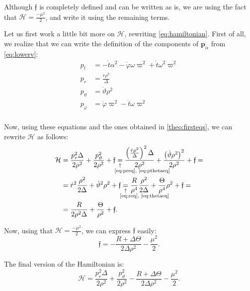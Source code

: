Although $\mathfrak{f}$ is completely defined and can be written as is, we are using the fact that $\mathcal{H} = \frac{-\mu^2}{2}$, and write it using the remaining terms.

Let us first work a little bit more on $\mathcal{H}$, rewriting \autoref{eq:hamiltonian}. First of all, we realize that we can write the definition of the components of $\mathbf{p}_\alpha$ from \autoref{eq:lowerv}:
\begin{align}
	\label{eq:pteq}
	p_t &= -\dot{t}\alpha^2 - \dot{\varphi}\omega\varpi^2 + \dot{t}\omega^2\varpi^2 \\
	\label{eq:preq}
	p_r &= \frac{\dot{r}\rho^2}{\Delta}\\
	\label{eq:pthetaeq}
	p_\vartheta &= \dot{\vartheta}\rho^2\\
	\label{eq:pphieq}
	p_\varphi &= \dot{\varphi}\varpi^2 - \dot{t}\omega\varpi^2\\
\end{align}

Now, using these equations and the ones obtained in \autoref{theo:firsteqs}, we can rewrite $\mathcal{H}$ as follows:
\begin{align*}
	\mathcal{H} &= \frac{p_r^2 \Delta}{2\rho^2} + \frac{p_\vartheta^2}{2\rho^2} + \mathfrak{f} \eqnote{=}{\ref{eq:preq}, \ref{eq:pthetaeq}} \frac{\left( \frac{\dot{r}\rho^2}{\Delta} \right)^2 \Delta}{2\rho^2} + \frac{\left(\dot{\vartheta}\rho^2\right)^2}{2\rho^2} + \mathfrak{f} = \\
	&= \dot{r}^2\frac{\rho^2}{2\Delta} + \dot{\vartheta}^2\rho^2 + \mathfrak{f} \eqnote{=}{\ref{eq:req}, \ref{eq:thetaeq}} \frac{R}{\rho^4 }\frac{\rho^2}{2\Delta} + \frac{\Theta}{\rho^4}\rho^2 + \mathfrak{f} =\\
	&= \frac{R}{2\rho^2\Delta} + \frac{\Theta}{\rho^2} + \mathfrak{f}.
\end{align*}

Now, using that $\mathcal{H} = \frac{-\mu^2}{2}$, we can express $\mathfrak{f}$ easily:
\[
	\mathfrak{f} = - \frac{R + \Delta \Theta}{2\Delta\rho^2} - \frac{\mu^2}{2}.
\]

The final version of the Hamiltonian is:
\begin{equation}
	\mathcal{H} = \frac{p_r^2 \Delta}{2\rho^2} + \frac{p_\vartheta^2}{2\rho^2} - \frac{R + \Delta \Theta}{2\Delta\rho^2} - \frac{\mu^2}{2}.
\end{equation}

